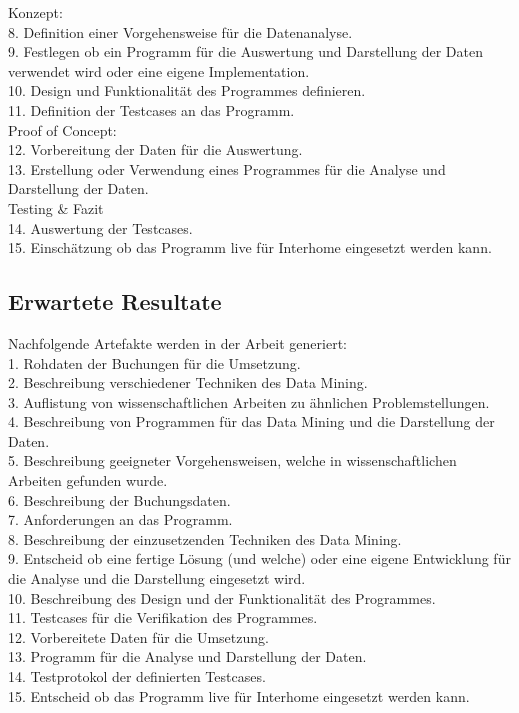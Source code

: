 \noindent Konzept:\\
8. Definition einer Vorgehensweise für die Datenanalyse.\\
9. Festlegen ob ein Programm für die Auswertung und Darstellung der Daten verwendet wird oder eine eigene Implementation.\\
10. Design und Funktionalität des Programmes definieren.\\
11. Definition der Testcases an das Programm.\\

\noindent Proof of Concept:\\
12. Vorbereitung der Daten für die Auswertung.\\
13. Erstellung oder Verwendung eines Programmes für die Analyse und Darstellung der Daten.\\

\noindent Testing \& Fazit\\
14. Auswertung der Testcases.\\
15. Einschätzung ob das Programm live für Interhome eingesetzt werden kann.\\

\subsection{Erwartete Resultate}
Nachfolgende Artefakte werden in der Arbeit generiert:\\
1. Rohdaten der Buchungen für die Umsetzung.\\
2. Beschreibung verschiedener Techniken des Data Mining.\\
3. Auflistung von wissenschaftlichen Arbeiten zu ähnlichen Problemstellungen.\\
4. Beschreibung von Programmen für das Data Mining und die Darstellung der Daten.\\
5. Beschreibung geeigneter Vorgehensweisen, welche in wissenschaftlichen Arbeiten gefunden wurde.\\
6. Beschreibung der Buchungsdaten.\\
7. Anforderungen an das Programm.\\
8. Beschreibung der einzusetzenden Techniken des Data Mining.\\
9. Entscheid ob eine fertige Lösung (und welche) oder eine eigene Entwicklung für die Analyse und die Darstellung eingesetzt wird. \\
10. Beschreibung des Design und der Funktionalität des Programmes.\\
11. Testcases für die Verifikation des Programmes.\\
12. Vorbereitete Daten für die Umsetzung.\\
13. Programm für die Analyse und Darstellung der Daten.\\
14. Testprotokol der definierten Testcases.\\
15. Entscheid ob das Programm live für Interhome eingesetzt werden kann.\\